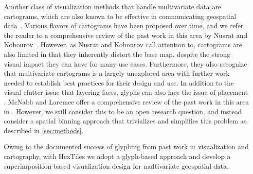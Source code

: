 Another class of visualization methods that handle multivariate data are cartograms, which are also known to be effective in communicating geospatial data~\cite{nusrat2017cartogram}.
%
Various flavors of cartograms have been proposed over time, and we refer the reader to a comprehensive review of the past work in this area by Nusrat and Kobourov~\cite{nusrat_state_2016}.
%
However, as Nusrat and Kobourov call attention to, cartograms are also limited in that they inherently distort the base map, despite the strong visual impact they can have for many use cases.
%
Furthermore, they also recognize that multivariate cartograms is a largely unexplored area with further work needed to establish best practices for their design and use.
%
In addition to the visual clutter issue that layering faces, glyphs can also face the issue of placement \cite{mcnabb_multivariate_2019, tsorlini_designing_2017}.
%
McNabb and Laremee offer a comprehensive review of the past work in this area in \cite{mcnabb_multivariate_2019}.
%
However, we still consider this to be an open research question, and instead consider a spatial binning approach that trivializes and simplifies this problem as described in \cref{sec:methods}.

Owing to the documented success of glyphing from past work in visualization and cartography, with HexTiles we adopt a glyph-based approach and develop a superimposition-based visualization design for multivariate geospatial data.



